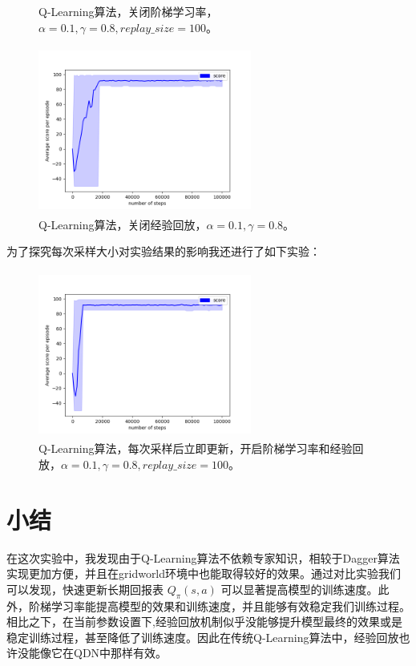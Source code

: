 \documentclass[a4paper,12pt]{article}
\begin{document}
\begin{CJK}{UTF8}{gbsn}
\begin{figure}[h!]
	\caption{Q-Learning算法，关闭阶梯学习率，$\alpha=0.1,\gamma=0.8,replay\_size=100$。}
	\label{performance}
	\vspace{-0.3cm}
\end{figure}
\begin{figure}[h!]
	\centering
	\includegraphics[width=7cm,height=5.5cm]{./code/performance_al=0.1_ga=0.8_laal=T.png}
	\caption{Q-Learning算法，关闭经验回放，$\alpha=0.1,\gamma=0.8$。}
	\label{performance}
	\vspace{-0.3cm}
\end{figure}
\newpage
为了探究每次采样大小对实验结果的影响我还进行了如下实验：
\begin{figure}[h!]
	\centering
	\includegraphics[width=7cm,height=5.5cm]{./code/performance_bs=1.png}
	\caption{Q-Learning算法，每次采样后立即更新，开启阶梯学习率和经验回放，$\alpha=0.1,\gamma=0.8,replay\_size=100$。}
	\label{performance}
	\vspace{-0.3cm}
\end{figure}
\section{小结}
在这次实验中，我发现由于Q-Learning算法不依赖专家知识，相较于Dagger算法实现更加方便，并且在gridworld环境中也能取得较好的效果。通过对比实验我们可以发现，快速更新长期回报表 $Q_\pi(s,a)$ 可以显著提高模型的训练速度。此外，阶梯学习率能提高模型的效果和训练速度，并且能够有效稳定我们训练过程。相比之下，在当前参数设置下,经验回放机制似乎没能够提升模型最终的效果或是稳定训练过程，甚至降低了训练速度。因此在传统Q-Learning算法中，经验回放也许没能像它在QDN中那样有效。

\end{CJK}
\end{document}
